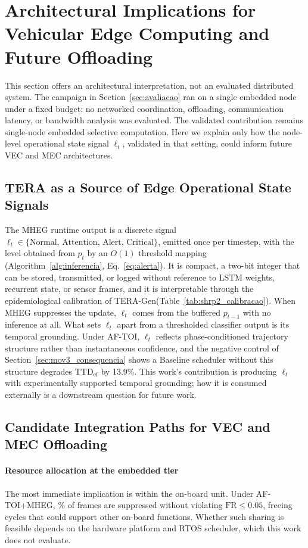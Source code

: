 \documentclass[a4paper,fleqn]{cas-dc}
\newcommand{\TERAGen}{\mbox{TERA-Gen}\xspace}
\newcommand{\AFTOI}{\mbox{AF-TOI}\xspace}
\newcommand{\MHEG}{\mbox{MHEG}\xspace}
\begin{document}
\section{Architectural Implications for Vehicular Edge Computing and Future Offloading}
\label{sec:vecmec}
This section offers an architectural interpretation, not an evaluated
distributed system. The campaign in Section~\ref{sec:avaliacao} ran on a single
embedded node under a fixed budget: no networked coordination, offloading,
communication latency, or bandwidth analysis was evaluated. The validated
contribution remains single-node embedded selective computation. Here we explain
only how the node-level operational state signal $\ell_t$, validated in that
setting, could inform future VEC and MEC architectures.
\subsection{TERA as a Source of Edge Operational State Signals}
\label{sec:tera_opsignal}
The \MHEG runtime output is a discrete signal
$\ell_t \in \{\text{Normal},\, \text{Attention},\, \text{Alert},\,
\text{Critical}\}$, emitted once per timestep{\color{\revcolor}, with the level
obtained from $p_t$ by an $O(1)$ threshold mapping
(Algorithm~\ref{alg:inferencia}, Eq.~\ref{eq:alerta})}. It is compact, a two-bit
integer that can be stored, transmitted, or logged without reference to LSTM
weights, recurrent state, or sensor frames, and it is interpretable through the
epidemiological calibration of \TERAGen (Table~\ref{tab:shrp2_calibracao}). When
\MHEG suppresses the update, $\ell_t$ comes from the buffered $p_{t-1}$ with no
inference at all.
What sets $\ell_t$ apart from a thresholded classifier output is its temporal
grounding. Under \AFTOI, $\ell_t$ reflects phase-conditioned trajectory
structure rather than instantaneous confidence, and the negative control of
Section~\ref{sec:mov3_consequencia} shows a Baseline scheduler without this
structure degrades $\mathrm{TTD}_{\mathrm{ef}}$ by {\color{\revcolor}13.9\%}. This work's
contribution is producing $\ell_t$ with experimentally supported temporal
grounding; how it is consumed externally is a downstream question for future
work.
\subsection{Candidate Integration Paths for VEC and MEC Offloading}
\label{sec:vecmec_implications}
\paragraph{Resource allocation at the embedded tier}
The most immediate implication is within the on-board unit. Under \mbox{AF-TOI}+MHEG,
{\color{\revcolor}\SkipRate\%} of frames are suppressed without violating $\mathrm{FR} \le 0.05$,
freeing cycles that could support other on-board functions. Whether such sharing
is feasible depends on the hardware platform and RTOS scheduler, which this work
does not evaluate.
\end{document}
